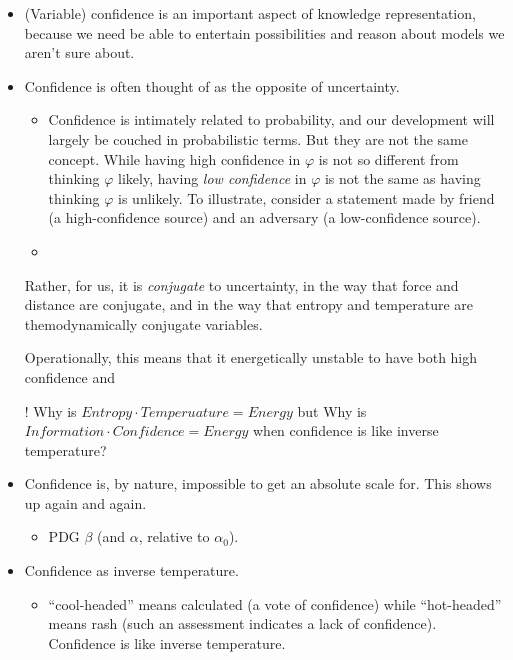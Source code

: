 \documentclass{article}
\begin{document}
\begin{itemize}
\item
(Variable) confidence is an important aspect of knowledge representation, because we need be able to entertain possibilities and reason about models we aren't sure about.

\item
Confidence is often thought of as the opposite of uncertainty.

\begin{itemize}
    \item
    Confidence is intimately related to probability, and our development will largely be couched in probabilistic terms. But they are not the same concept.
    While having high confidence in $\varphi$ is not so different from thinking $\varphi$ likely, having \emph{low confidence} in $\varphi$ is not the same as having thinking $\varphi$ is unlikely.
    To illustrate, consider a statement made by friend (a high-confidence source) and an adversary (a low-confidence source).

    \item
\end{itemize}

Rather, for us, it is \emph{conjugate} to uncertainty, in the way that force and distance are conjugate, and in the way that entropy and temperature are themodynamically conjugate variables.

Operationally, this means that it energetically unstable to have both high confidence and

\begin{wip}
! Why is $\mathit{Entropy} \cdot \mathit{Temperuature} = \mathit{Energy}$ but
 Why is $\mathit{Information} \cdot \mathit{Confidence} = \mathit{Energy}$ when confidence is like inverse temperature?
\end{wip}

\item
Confidence is, by nature, impossible to get an absolute scale for. This shows up again and again.
\begin{itemize}[nosep]
    \item PDG $\beta$ (and $\alpha$, relative to $\alpha_0$).
\end{itemize}

\item Confidence as inverse temperature.

\begin{itemize}
    \item
    ``cool-headed'' means calculated (a vote of confidence) while ``hot-headed'' means rash (such an assessment indicates a lack of confidence). Confidence is like inverse temperature.


\end{itemize}
\end{itemize}
\end{document}
